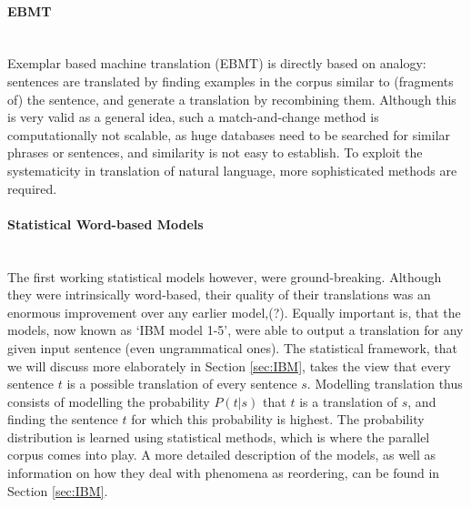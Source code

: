 \documentclass{report}
\newcommand{\myparagraph}[1]{\paragraph{#1}\mbox{}\\}
\theoremstyle{definition}
\theoremstyle{plain}
\begin{document}
\myparagraph{EBMT}
Exemplar based machine translation (EBMT) is directly based on analogy: sentences are translated by finding examples in the corpus similar to (fragments of) the sentence, and generate a translation by recombining them. Although this is very valid as a general idea, such a match-and-change method is computationally not scalable, as huge databases need to be searched for similar phrases or sentences, and similarity is not easy to establish. To exploit the systematicity in translation of natural language, more sophisticated methods are required.

\myparagraph{Statistical Word-based Models}
The first working statistical models \citep{brown1988statistical,brown1990statistical,brown1993mathematics} however, were ground-breaking. Although they were intrinsically word-based, their quality of their translations was an enormous improvement over any earlier model,(?). Equally important is, that the models, now known as `IBM model 1-5', were able to output a translation for any given input sentence (even ungrammatical ones). The statistical framework, that we will discuss more elaborately in Section \ref{sec:IBM}, takes the view that every sentence $t$ is a possible translation of every sentence $s$. Modelling translation thus consists of modelling the probability $P(t|s)$ that $t$ is a translation of $s$, and finding the sentence $t$ for which this probability is highest. The probability distribution is learned using statistical methods, which is where the parallel corpus comes into play. A more detailed description of the models, as well as information on how they deal with phenomena as reordering, can be found in Section \ref{sec:IBM}.
\end{document}
